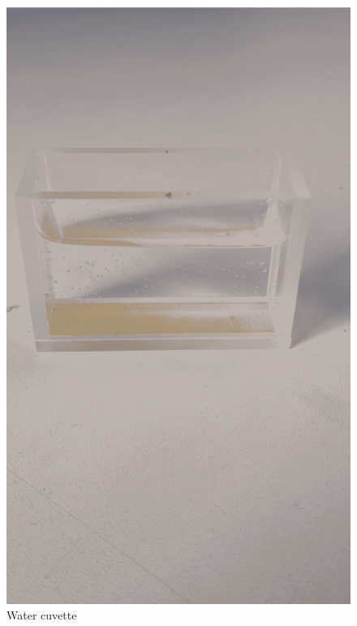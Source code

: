 \documentclass{beamer}
\begin{document}
\begin{frame}
\begin{columns}
\begin{figure}
				\includegraphics[width=\linewidth]{res/water_cuvette.png}
				\caption*{Water cuvette}
			\end{figure}
		\end{columns}
	\end{frame}	
	
\end{document}
